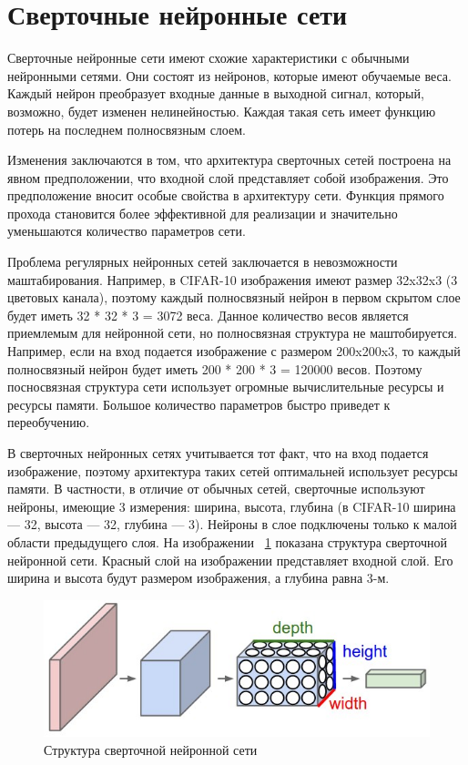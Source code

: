\documentclass[a4paper,english,russian]{G2-105}
\begin{document}
\section{Сверточные нейронные сети}
\par Сверточные нейронные сети имеют схожие характеристики с обычными нейронными сетями. Они состоят из нейронов, которые имеют обучаемые веса. Каждый нейрон преобразует входные данные в выходной сигнал, который, возможно, будет изменен нелинейностью. Каждая такая сеть имеет функцию потерь на последнем полносвязным слоем.
\par Изменения заключаются в том, что архитектура сверточных сетей построена на явном предположении, что входной слой представляет собой изображения. Это предположение вносит особые свойства в архитектуру сети. Функция прямого прохода становится более эффективной для реализации и значительно уменьшаются количество параметров сети.
\par Проблема регулярных нейронных сетей заключается в невозможности маштабирования. Например, в CIFAR-10 изображения имеют размер 32x32x3 (3 цветовых канала), поэтому каждый полносвязный нейрон в первом скрытом слое будет иметь 32 * 32 * 3 = 3072 веса. Данное количество весов является приемлемым для нейронной сети, но полносвязная структура не маштобируется. Например, если на вход подается изображение с размером 200x200x3, то каждый полносвязный нейрон будет иметь 200 * 200 * 3 = 120000 весов. Поэтому посносвязная структура сети использует огромные вычислительные ресурсы и ресурсы памяти. Большое количество параметров быстро приведет к переобучению.
\par В сверточных нейронных сетях учитывается тот факт, что на вход подается изображение, поэтому архитектура таких сетей оптимальней использует ресурсы памяти. В частности, в отличие от обычных сетей, сверточные используют нейроны, имеющие 3 измерения: ширина, высота, глубина (в CIFAR-10 ширина --- 32, высота --- 32, глубина --- 3). Нейроны в слое подключены только к малой области предыдущего слоя. На изображении ~\ref{convnn} показана структура сверточной нейронной сети. Красный слой на изображении представляет входной слой. Его ширина и высота будут размером изображения, а глубина равна 3-м.
\begin{figure}
    \includegraphics[width=\linewidth]{convnn.png}
    \caption{Структура сверточной нейронной сети}
	\label{convnn}
\end{figure}
\end{document}
